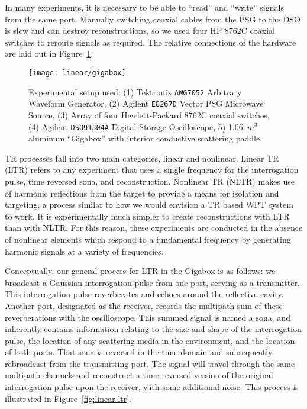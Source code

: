In many experiments, it is necessary to be able to ``read'' and ``write'' signals from the same port. Manually switching coaxial cables from the PSG to the DSO is slow and can destroy reconstructions, so we used four HP 8762C coaxial switches to reroute signals as required. The relative connections of the hardware are laid out in Figure~\ref{fig:linear-gigabox}.

\begin{figure}[h!]
\centering
\texttt{[image: linear/gigabox]}
    \caption[Experimental Setup]{Experimental setup used: (1) Tektronix \texttt{AWG7052} Arbitrary Waveform Generator, (2) Agilent \texttt{E8267D} Vector PSG Microwave Source, (3) Array of four Hewlett-Packard 8762C coaxial switches, (4) Agilent \texttt{DSO91304A} Digital Storage Oscilloscope, 5) 1.06~$m^3$ aluminum ``Gigabox'' with interior conductive scattering paddle.}
    \label{fig:linear-gigabox}
\end{figure}

TR processes fall into two main categories, linear and nonlinear. Linear TR (LTR) refers to any experiment that uses a single frequency for the interrogation pulse, time reversed sona, and reconstruction. Nonlinear TR (NLTR) makes use of harmonic reflections from the target to provide a means for isolation and targeting, a process similar to how we would envision a TR based WPT system to work.  It is experimentally much simpler to create reconstructions with LTR than with NLTR. For this reason, these experiments are conducted in the absence of nonlinear elements which respond to a fundamental frequency by generating harmonic signals at a variety of frequencies. 

Conceptually, our general process for LTR in the Gigabox is as follows: we broadcast a Gaussian interrogation pulse from one port, serving as a transmitter. This interrogation pulse reverberates and echoes around the reflective cavity. Another port, designated as the receiver, records the multipath sum of these reverberations with the oscilloscope. This summed signal is named a sona, and inherently contains information relating to the size and shape of the interrogation pulse, the location of any scattering media in the environment, and the location of both ports. That sona is reversed in the time domain and subsequently rebroadcast from the transmitting port. The signal will travel through the same multipath channels and reconstruct a time reversed version of the original interrogation pulse upon the receiver, with some additional noise. This process is illustrated in Figure~\ref{fig:linear-ltr}.

